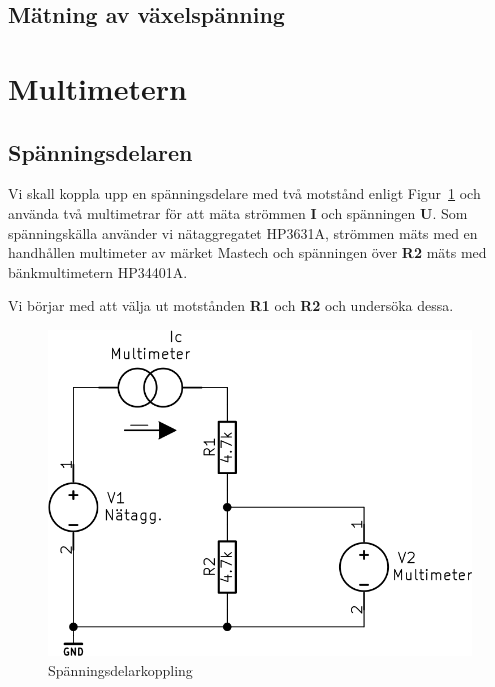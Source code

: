 \documentclass[11pt,a4paper]{article}
\begin{document}
\subsection{Mätning av växelspänning}\label{meas_ac}

\section{Multimetern}\label{}

\subsection{Spänningsdelaren}\label{vdiv}
Vi skall koppla upp en spänningsdelare med två motstånd enligt 
Figur~\ref{fig:2-mm-schem} och använda två multimetrar för att mäta strömmen 
\textbf{I} och spänningen \textbf{U}. Som spänningskälla använder vi 
nätaggregatet HP3631A, strömmen mäts med en handhållen multimeter av märket
Mastech och spänningen över \textbf{R2} mäts med bänkmultimetern HP34401A.
\par Vi börjar med att välja ut motstånden \textbf{R1} och \textbf{R2} och 
undersöka dessa.

\begin{figure}[htbp]
    \centering
        \includegraphics[scale=0.5]{kicad/2-multimeter-schema.png}
    \caption{Spänningsdelarkoppling}
    \label{fig:2-mm-schem}
\end{figure}
\end{document}
